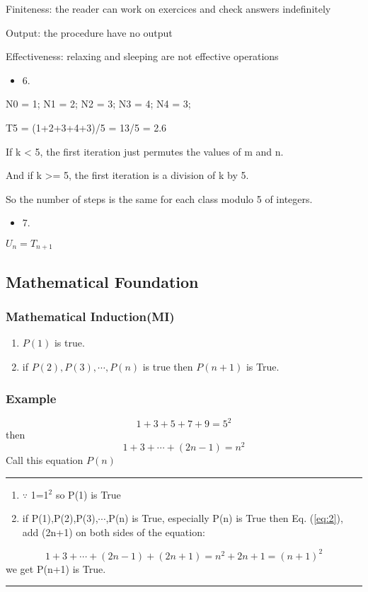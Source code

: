 \documentclass[11pt]{article}
\begin{document}
Finiteness: the reader can work on exercices and check answers indefinitely

Output: the procedure have no output

Effectiveness: relaxing and sleeping are not effective operations
\begin{itemize}
\item 6.
\end{itemize}

N0 = 1; N1 = 2; N2 = 3; N3 = 4; N4 = 3;

T5 = (1+2+3+4+3)/5 = 13/5 = 2.6

If k < 5, the first iteration just permutes the values of m and n.

And if k >= 5, the first iteration is a division of k by 5.

So the number of steps is the same for each class modulo 5 of integers.
\begin{itemize}
\item 7.
\end{itemize}

$U_n=T_{n+1}$

\subsection{Mathematical Foundation}
\label{sec-1-2}
\subsubsection{Mathematical Induction(MI)}
\label{sec-1-2-1}
\begin{enumerate}
\item $P(1)$ is true.
\item if $P(2),P(3),\cdots,P(n)$ is true then $P(n+1)$ is True.
\end{enumerate}
\subsubsection{Example}
\label{sec-1-2-2}
\begin{equation}
\label{eq:1}
1+3+5+7+9=5^2
\end{equation}
then 
\begin{equation}
\label{eq:2}
1+3+\cdots+(2n-1)=n^2
\end{equation}
Call this equation $P(n)$

\rule{\linewidth}{0.5pt}
\begin{enumerate}
\item $\because$ 1=1$^{\text{2}}$ so P(1) is True
\item if P(1),P(2),P(3),$\cdots{}$,P(n) is True, especially P(n) is True then Eq. (\ref{eq:2}), add (2n+1) on both sides of the equation:
\end{enumerate}
\begin{equation*}
1+3+\cdots+(2n-1)+(2n+1)=n^2+2n+1=(n+1)^2
\end{equation*}
we get P(n+1) is True.

\rule{\linewidth}{0.5pt}
\end{document}
